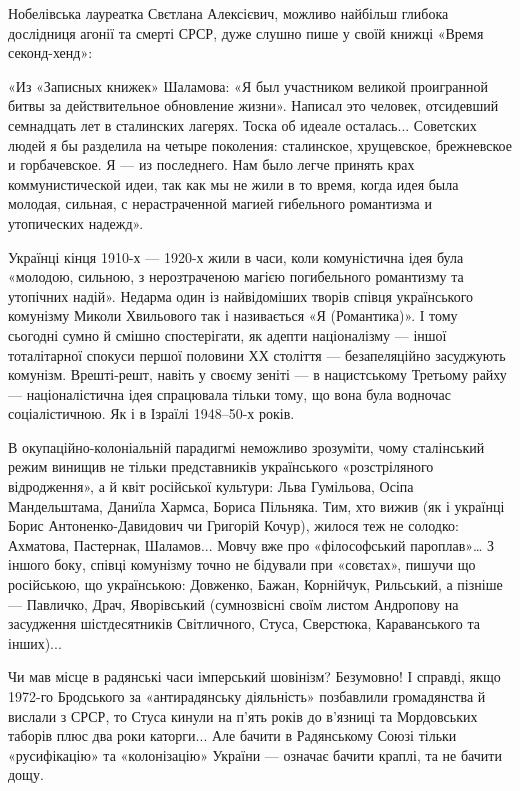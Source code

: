 Нобелівська лауреатка Свєтлана Алексієвич, можливо найбільш глибока дослідниця
агонії та смерті СРСР, дуже слушно пише у своїй книжці «Время секонд-хенд»: 

\begin{zzquote}
«Из «Записных книжек» Шаламова: «Я был участником великой проигранной битвы за
действительное обновление жизни». Написал это человек, отсидевший семнадцать
лет в сталинских лагерях. Тоска об идеале осталась... Советских людей я бы
разделила на четыре поколения: сталинское, хрущевское, брежневское и
горбачевское. Я — из последнего. Нам было легче принять крах коммунистической
идеи, так как мы не жили в то время, когда идея была молодая, сильная, с
нерастраченной магией гибельного романтизма и утопических надежд».
\end{zzquote}

Українці кінця 1910-х — 1920-х жили в часи, коли комуністична ідея була
«молодою, сильною, з нерозтраченою магією погибельного романтизму та утопічних
надій». Недарма один із найвідоміших творів співця українського комунізму
Миколи Хвильового так і називається «Я (Романтика)». І тому сьогодні сумно й
смішно спостерігати, як адепти націоналізму — іншої тоталітарної спокуси першої
половини ХХ століття — безапеляційно засуджують комунізм. Врешті-решт, навіть у
своєму зеніті — в нацистському Третьому райху — націоналістична ідея спрацювала
тільки тому, що вона була водночас соціалістичною. Як і в Ізраїлі 1948–50-х
років.

В окупаційно-колоніальній парадигмі неможливо зрозуміти, чому сталінський режим
винищив не тільки представників українського «розстріляного відродження», а й
квіт російської культури: Льва Гумільова, Осіпа Мандельштама, Даниїла Хармса,
Бориса Пільняка. Тим, хто вижив (як і українці Борис Антоненко-Давидович чи
Григорій Кочур), жилося теж не солодко: Ахматова, Пастернак, Шаламов... Мовчу
вже про «філософський пароплав»… З іншого боку, співці комунізму точно не
бідували при «совєтах», пишучи що російською, що українською: Довженко, Бажан,
Корнійчук, Рильський, а пізніше — Павличко, Драч, Яворівський (сумнозвісні
своїм листом Андропову на засудження шістдесятників Світличного, Стуса,
Сверстюка, Караванського та інших)... 
 
Чи мав місце в радянські часи імперський шовінізм? Безумовно! І справді, якщо
1972-го Бродського за «антирадянську діяльність» позбавлили громадянства й
вислали з СРСР, то Стуса кинули на п’ять років до в’язниці та Мордовських
таборів плюс два роки каторги... Але бачити в Радянському Союзі тільки
«русифікацію» та «колонізацію» України — означає бачити краплі, та не бачити
дощу. 

